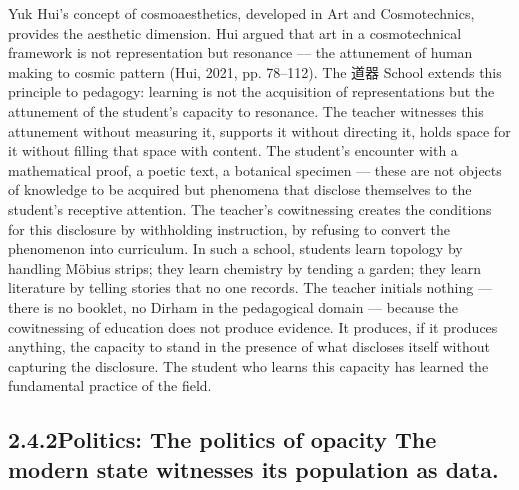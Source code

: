 Yuk Hui’s concept of cosmoaesthetics, developed in Art and Cosmotechnics, provides the aesthetic dimension. Hui argued that art in a cosmotechnical framework is not representation but resonance — the attunement of human making to cosmic pattern (Hui, 2021, pp. 78–112). The 道器 School extends this principle to pedagogy: learning is not the acquisition of representations but the attunement of the student’s capacity to resonance. The teacher witnesses this attunement without measuring it, supports it without directing it, holds space for it without filling that space with content. The student’s encounter with a mathematical proof, a poetic text, a botanical specimen — these are not objects of knowledge to be acquired but phenomena that disclose themselves to the student’s receptive attention. The teacher’s cowitnessing creates the conditions for this disclosure by withholding instruction, by refusing to convert the phenomenon into curriculum. In such a school, students learn topology by handling Möbius strips; they learn chemistry by tending a garden; they learn literature by telling stories that no one records. The teacher initials nothing — there is no booklet, no Dirham in the pedagogical domain — because the cowitnessing of education does not produce evidence. It produces, if it produces anything, the capacity to stand in the presence of what discloses itself without capturing the disclosure. The student who learns this capacity has learned the fundamental practice of the field.

\subsection{2.4.2\quad Politics: The politics of opacity The modern state witnesses its population as data.}

